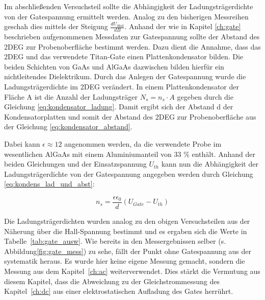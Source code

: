 
Im abschließenden Versuchsteil sollte die Abhängigkeit der Ladungsträgerdichte von der Gatespannung ermittelt werden. Analog zu den bisherigen Messreihen geschah dies mittels der Steigung $\frac{dU_{Hall}}{dB}$. Anhand der wie in Kapitel \ref{ch:gate} beschrieben aufgenommenen Messdaten zur Gatespannung sollte der Abstand des 2DEG zur Probenoberfläche bestimmt werden. Dazu dient die Annahme, dass das 2DEG und das verwendete Titan-Gate einen Plattenkondensator bilden. Die beiden Schichten von GaAs und AlGaAs dazwischen bilden hierfür ein nichtleitendes Dielektrikum. 
Durch das Anlegen der Gatespannung wurde die Ladungsträgerdichte im 2DEG verändert. 
In einem Plattenkondensator der Fläche A ist die Anzahl der Ladungsträger $N_s=n_s \cdot A$ gegeben durch die Gleichung \ref{eq:kondensator_ladung}. 
Damit ergibt sich der Abstand d der Kondensatorplatten und somit der Abstand des 2DEG zur Probenoberfläche aus der Gleichung \ref{eq:kondensator_abstand}. 

Dabei kann $\epsilon \approx 12$ angenommen werden, da die verwendete Probe im wesentlichen AlGaAs mit einem Aluminiumanteil von 33 \% enthält.
Anhand der beiden Gleichungen und der Einsatzspannung $U_{th}$ kann nun die Abhängigkeit der Ladungsträgerdichte von der Gatespannung angegeben werden durch Gleichung \ref{eq:kondens_lad_und_abst}:

\begin{equation}
	n_s=\frac{\epsilon \epsilon_0}{d}(U_{Gate}-U_{th})
	\label{eq:ns_kond}
\end{equation}

Die Ladungsträgerdichten wurden analog zu den obigen Versuchsteilen aus der Näherung über die Hall-Spannung bestimmt und es ergaben sich die Werte in Tabelle~\ref{tab:gate_ausw}. Wie bereits in den Messergebnissen selber (s. Abbildung\ref{fig:gate_mess}) zu sehe, fällt der Punkt ohne Gatespannung aus der systematik heraus. Es wurde hier keine eigene Messung gemacht, sondern die Messung aus dem Kapitel~\ref{ch:ac} weiterverwendet. Dies stärkt die Vermutung aus diesem Kapitel, dass die Abweichung zu der Gleichstrommessung des Kapitel~\ref{ch:dc} aus einer elektrostatischen Aufladung des Gates herrührt.


